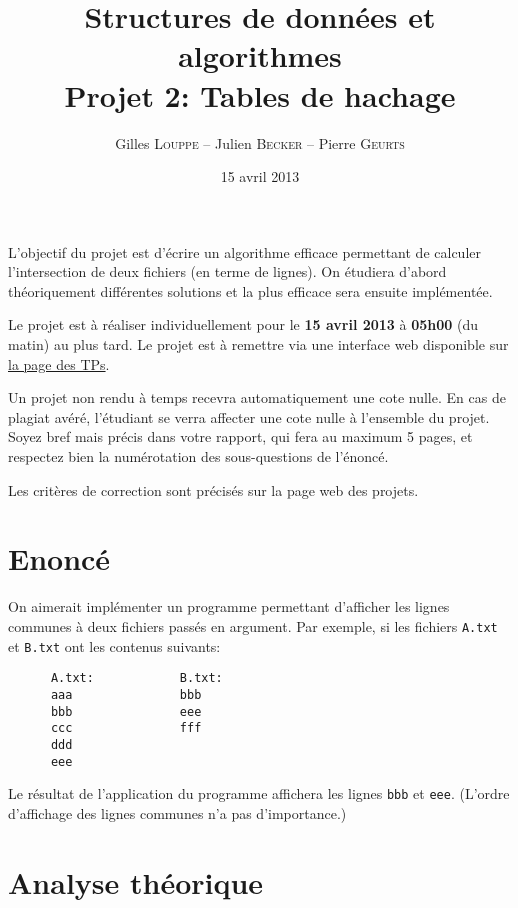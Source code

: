 \documentclass[a4paper,10pt]{article}
\title{
    \textbf{Structures de données et algorithmes}\\
    Projet 2: Tables de hachage
}
\author{Gilles \textsc{Louppe} -- Julien \textsc{Becker} -- Pierre \textsc{Geurts}}
\date{15 avril 2013}
\begin{document}
\maketitle

L'objectif du projet est d'écrire un algorithme efficace permettant de
calculer l'intersection de deux fichiers (en terme de lignes). On
étudiera d'abord théoriquement différentes solutions et la plus
efficace sera ensuite implémentée.

Le projet est à réaliser individuellement pour le {\bf 15 avril 2013}
à {\bf 05h00} (du matin) au plus tard. Le projet est à remettre via
une interface web disponible sur
\href{http://www.montefiore.ulg.ac.be/~glouppe/2012-2013/students.info0902.php}{la
  page des TPs}.

Un projet non rendu à temps recevra automatiquement une cote nulle. En
cas de plagiat avéré, l'étudiant se verra affecter une cote nulle à
l'ensemble du projet. Soyez bref mais précis dans votre rapport, qui
fera au maximum 5 pages, et respectez bien la numérotation des
sous-questions de l'énoncé.

Les critères de correction sont précisés sur la page web des projets.

\section{Enoncé}

On aimerait implémenter un programme permettant d'afficher les lignes
communes à deux fichiers passés en argument. Par exemple, si les
fichiers \texttt{A.txt} et \texttt{B.txt} ont les contenus suivants:

\begin{verbatim}
      A.txt:            B.txt:
      aaa               bbb
      bbb               eee
      ccc               fff
      ddd
      eee
\end{verbatim}

Le résultat de l'application du programme affichera les lignes
\texttt{bbb} et \texttt{eee}. (L'ordre d'affichage des lignes communes n'a pas
d'importance.)

\section{Analyse théorique}
\end{document}
